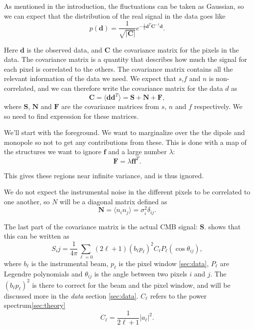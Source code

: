\documentclass{emulateapj}
\begin{document}
As mentioned in the introduction, the fluctuations can be taken as Gaussian, so we can expect that the distribution of the real signal in the data goes like
\begin{equation}
p(\mathbf{d}) = \frac{1}{\sqrt{|\mathbf{C}|}}e^{-\frac{1}{2}\mathbf{d}^T \mathbf{C}^{-1}\mathbf{d}}.
\label{eq:prob}
 \end{equation} 

Here $\mathbf{d}$ is the observed data, and $\mathbf{C}$ the covariance matrix for the pixels in the data. The covariance matrix is a quantity that describes how much the signal for each pixel is correlated to the others. The covariance matrix contains all the relevant information of the data we need. We expect that $s$,$f$ and $n$ is non-correlated, and we can therefore write the covariance matrix for the data $d$ as 
\begin{equation}
\mathbf{C} = \langle \mathbf{d}\mathbf{d}^T\rangle = \mathbf{S} + \mathbf{N} + \mathbf{F},
\label{eq:C}
\end{equation}
where $\mathbf{S}$, $\mathbf{N}$ and $\mathbf{F}$ are the covariance matrices from $s$, $n$ and $f$ respectively. We so need to find expression for these matrices. 

We'll start with the foreground. We want to marginalize over the the dipole and monopole so not to get any contributions from these. This is done with a map of the structures we want to ignore $\mathbf{f}$ and a large number $\lambda$:
\begin{equation}
\mathbf{F} = \lambda \mathbf{f}\mathbf{f}^T.
\end{equation}

This gives these regions near infinite variance, and is thus ignored.

We do not expect the instrumental noise in the different pixels to be correlated to one another, so $N$ will be a diagonal matrix defined as
\begin{equation}
\mathbf{N} = \langle n_i n_j\rangle = \sigma_i^2\delta_{ij}.
\end{equation}

The last part of the covariance matrix is the actual CMB signal: $\mathbf{S}$. \cite{sunyaev} shows that this can be written as 
\begin{equation}
S_ij = \frac{1}{4\pi}\sum_{\ell=0}(2\ell + 1)(b_\ell p_\ell)^2 C_\ell P_\ell(\cos\theta_{ij}),
\end{equation}
where $b_\ell$ is the instrumental beam, $p_\ell$ is the pixel window \ref{sec:data}, $P_\ell$ are Legendre polynomials and $\theta_{ij}$ is the angle between two pixels $i$ and $j$. The $(b_\ell p_\ell)^2$ is there to correct for the beam and the pixel window, and will be discussed more in the \textit{data} section \ref{sec:data}. $C_\ell$ refers to the power spectrum\ref{sec:theory} 
\begin{equation}
C_\ell = \frac{1}{2\ell +1}|a_\ell|^2.
\end{equation}
\end{document}
